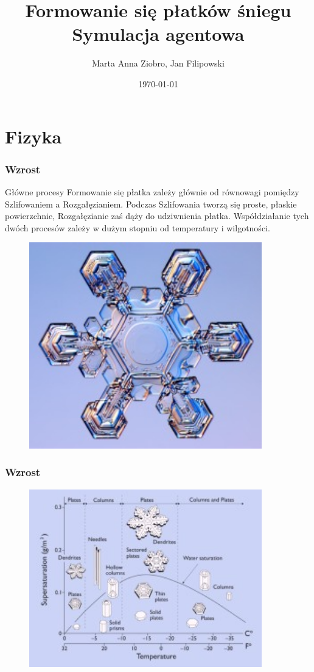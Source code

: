 \documentclass[]{beamer}
\title[Płatki Śniegu]{Formowanie się płatków śniegu\\Symulacja agentowa}
\author{Marta Anna Ziobro, Jan Filipowski}
\date{\today}
\begin{document}
\begin{frame}
	\titlepage
\end{frame}

\section{Fizyka}


\begin{frame}
	\frametitle{Wzrost}
	\begin{block}{Główne procesy}
		Formowanie się płatka zależy głównie od równowagi pomiędzy Szlifowaniem a Rozgałęzianiem. Podczas Szlifowania tworzą się proste, 
		płaskie powierzchnie, Rozgałęzianie zaś dąży do udziwnienia płatka. 
		Współdziałanie tych dwóch procesów zależy w dużym stopniu od temperatury i wilgotności. 
	\end{block}
	\begin{figure}[h]
		\centering
		\includegraphics[width=0.9\textwidth]{crystal1.jpg}
	\end{figure}
\end{frame}


\begin{frame}
	\frametitle{Wzrost}
	\begin{figure}[h]
		\centering
		\includegraphics[width=0.9\textwidth]{morphologydiagram.jpg}
	\end{figure}
\end{frame}
\end{document}
